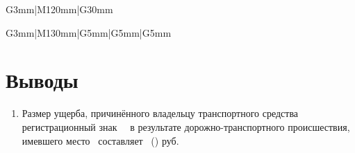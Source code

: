 \begin{longtable}{G{3mm}|M{120mm}|G{30mm}}
\begin{longtable}{G{3mm}|M{130mm}|G{5mm}|G{5mm}|G{5mm}}


\section{Выводы}
%
%
\begin{enumerate}
\item Размер ущерба, причинённого владельцу  транспортного средства \tc\, регистрационный знак \, \, в результате дорожно-транспортного происшествия, имевшего место \,  составляет  \, ()  руб.\\[3mm]


\end{enumerate}
\end{longtable}
\end{longtable}
